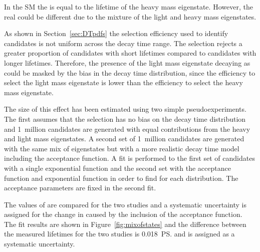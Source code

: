 In the SM the \bsmumu \el is equal to the lifetime of the heavy \bs mass eigenstate. However, the real \bsmumu \el could be different due to the mixture of the light and heavy mass eigenstates. %

As shown in Section~\ref{sec:DTpdfs} the selection efficiency used to identify \bsmumu candidates is not uniform across the decay time range. The selection rejects a greater proportion of candidates with short lifetimes compared to candidates with longer lifetimes. Therefore, the presence of the light \bs mass eigenstate decaying as \bsmumu could be masked by the bias in the decay time distribution, since the efficiency to select the light \bs mass eigenstate is lower than the efficiency to select the heavy \bs mass eigenstate.

The size of this effect has been estimated using two simple pseudoexperiments. The first assumes that the selection has no bias on the decay time distribution and 1~million candidates are generated with equal contributions from the heavy and light \bs mass eigenstates. %
 A second set of 1~million candidates are generated with the same mix of eigenstates but with a more realistic decay time model including the \bsmumu acceptance function. A fit is performed to the first set of candidates with a single exponential function and the second set with the acceptance function and exponential function in order to find \tmumu for each distribution. The acceptance parameters are fixed in the second fit.

The values of \tmumu are compared for the two studies and a systematic uncertainty is assigned for the change in \tmumu caused by the inclusion of the acceptance function. The fit results are shown in Figure~\ref{fig:mixofstates} and the difference between the measured lifetimes for the two studies is 0.018~\ps and is assigned as a systematic uncertainty.

